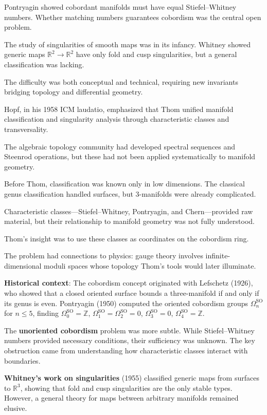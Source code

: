 Pontryagin showed cobordant manifolds must have equal Stiefel--Whitney numbers.
Whether matching numbers guarantees cobordism was the central open problem.

The study of singularities of smooth maps was in its infancy. Whitney showed
generic maps $\mathbb{R}^2 \to \mathbb{R}^2$ have only fold and cusp
singularities, but a general classification was lacking.

The difficulty was both conceptual and technical, requiring new invariants
bridging topology and differential geometry.

Hopf, in his 1958 ICM laudatio, emphasized that Thom unified manifold
classification and singularity analysis through characteristic classes and
transversality.

The algebraic topology community had developed spectral sequences and Steenrod
operations, but these had not been applied systematically to manifold geometry.

Before Thom, classification was known only in low dimensions. The classical genus
classification handled surfaces, but 3-manifolds were already complicated.

Characteristic classes---Stiefel--Whitney, Pontryagin, and Chern---provided raw
material, but their relationship to manifold geometry was not fully understood.

Thom's insight was to use these classes as coordinates on the cobordism ring.

The problem had connections to physics: gauge theory involves infinite-dimensional
moduli spaces whose topology Thom's tools would later illuminate.

\textbf{Historical context}: The cobordism concept originated with Lefschetz
(1926), who showed that a closed oriented surface bounds a three-manifold if and
only if its genus is even. Pontryagin (1950) computed the oriented cobordism
groups $\Omega_n^{\text{SO}}$ for $n \leq 5$, finding $\Omega_0^{\text{SO}} = \mathbb{Z}$,
$\Omega_1^{\text{SO}} = \Omega_2^{\text{SO}} = 0$, $\Omega_3^{\text{SO}} = 0$,
$\Omega_4^{\text{SO}} = \mathbb{Z}$.

The \textbf{unoriented cobordism} problem was more subtle. While Stiefel--Whitney
numbers provided necessary conditions, their sufficiency was unknown. The key
obstruction came from understanding how characteristic classes interact with
boundaries.

\textbf{Whitney's work on singularities} (1955) classified generic maps from
surfaces to $\mathbb{R}^3$, showing that fold and cusp singularities are the
only stable types. However, a general theory for maps between arbitrary manifolds
remained elusive.

